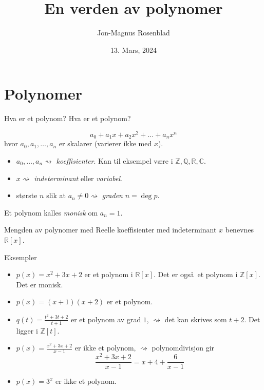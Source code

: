 \documentclass[norsk, handout]{beamer}
\title{En verden av polynomer}
\author{Jon-Magnus Rosenblad}
\date{13. Mars, 2024}
\theoremstyle{example}
\begin{document}
\frame{\titlepage}

\frame{\tableofcontents}

\section{Polynomer}

\begin{frame}{Hva er et polynom?}
    Hva er et polynom?
    \begin{definition}
        \[
            a_0 + a_1 x + a_2 x^2 + \dots + a_n x^n
        \]
        hvor $a_0, a_1, \dots, a_n$ er skalarer (varierer ikke med $x$).

        \begin{itemize}
            \item $a_0,\dots, a_n\rightsquigarrow$ \textit{koeffisienter}.
                Kan til eksempel være i $\mathbb Z, \mathbb Q, \mathbb R, \mathbb C$.
            \item $x\rightsquigarrow$ \textit{indeterminant} eller \textit{variabel}.
            \item største $n$ slik at $a_n\neq 0\rightsquigarrow$
                \textit{graden} $n = \deg p$.
        \end{itemize}

        Et polynom kalles \textit{monisk} om $a_n = 1$.

        Mengden av polynomer med Reelle koeffisienter med indeterminant $x$
        benevnes $\mathbb R[x]$.
    \end{definition}
\end{frame}

\begin{frame}{Eksempler}
    \begin{example}
        \begin{itemize}
            \item $p(x) = x^2 + 3x + 2$ er et polynom i $\mathbb R[x]$.
                Det er også et polynom i $\mathbb Z[x]$.
                Det er monisk.
            \item $p(x) = (x + 1)(x + 2)$ er et polynom.
            \item $q(t) = \frac {t^2 + 3t + 2}{t + 1}$ er et polynom av grad $1$,
                $\rightsquigarrow$ det kan skrives som $t + 2$.
                Det ligger i $\mathbb Z[t]$.
        \end{itemize}
    \end{example}
    \begin{example}
        \begin{itemize}
            \item $p(x) = \frac{x^2 + 3x + 2}{x - 1}$ er ikke et polynom,
                $\rightsquigarrow$ polynomdivisjon gir
                \[
                    \frac {x^2 + 3x + 2}{x - 1} = x + 4 + \frac 6 {x - 1}
                \]
            \item $p(x) = 3^x$ er ikke et polynom.
        \end{itemize}
    \end{example}
\end{frame}
\end{document}
